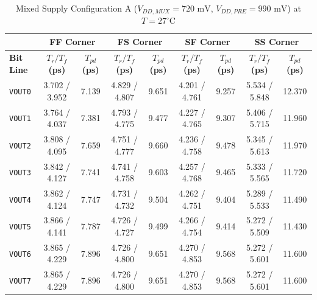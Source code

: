 \begin{table}[H]
    \centering
    \renewcommand{\arraystretch}{1.3}
    \setlength{\tabcolsep}{4pt}
    \small
    \begin{tabular}{|l|cc|cc|cc|cc|}
        \hline
        & \multicolumn{2}{c|}{\textbf{FF Corner}} & \multicolumn{2}{c|}{\textbf{FS Corner}} & \multicolumn{2}{c|}{\textbf{SF Corner}} & \multicolumn{2}{c|}{\textbf{SS Corner}} \\ \hline
        \textbf{Bit Line} & \textbf{$T_r / T_f$ (ps)} & \textbf{$T_{pd}$ (ps)} & \textbf{$T_r / T_f$ (ps)} & \textbf{$T_{pd}$ (ps)} & \textbf{$T_r / T_f$ (ps)} & \textbf{$T_{pd}$ (ps)} & \textbf{$T_r / T_f$ (ps)} & \textbf{$T_{pd}$ (ps)} \\ \hline
        \texttt{VOUT0} & 3.702 / 3.952 & 7.139 & 4.829 / 4.807 & 9.651 & 4.201 / 4.761 & 9.257 & 5.534 / 5.848 & 12.370 \\ 
        \texttt{VOUT1} & 3.764 / 4.037 & 7.381 & 4.793 / 4.775 & 9.477 & 4.227 / 4.765 & 9.307 & 5.406 / 5.715 & 11.960 \\ 
        \texttt{VOUT2} & 3.808 / 4.095 & 7.659 & 4.751 / 4.777 & 9.660 & 4.236 / 4.758 & 9.478 & 5.345 / 5.613 & 11.970 \\ 
        \texttt{VOUT3} & 3.842 / 4.127 & 7.741 & 4.741 / 4.758 & 9.603 & 4.257 / 4.768 & 9.465 & 5.333 / 5.565 & 11.720 \\ 
        \texttt{VOUT4} & 3.862 / 4.124 & 7.747 & 4.731 / 4.732 & 9.504 & 4.262 / 4.751 & 9.404 & 5.289 / 5.533 & 11.490 \\ 
        \texttt{VOUT5} & 3.866 / 4.141 & 7.787 & 4.726 / 4.727 & 9.499 & 4.266 / 4.754 & 9.414 & 5.272 / 5.509 & 11.430 \\ 
        \texttt{VOUT6} & 3.865 / 4.229 & 7.896 & 4.726 / 4.800 & 9.651 & 4.270 / 4.853 & 9.568 & 5.272 / 5.601 & 11.600 \\ 
        \texttt{VOUT7} & 3.865 / 4.229 & 7.896 & 4.726 / 4.800 & 9.651 & 4.270 / 4.853 & 9.568 & 5.272 / 5.601 & 11.600 \\ \hline
    \end{tabular}
    \vspace{2mm}
    \caption{Mixed Supply Configuration A ($V_{DD,MUX} = 720\text{ mV}$, $V_{DD,PRE} = 990\text{ mV}$) at $T = 27^{\circ}\text{C}$}
    \label{tab:asym_a_27}
\end{table}


